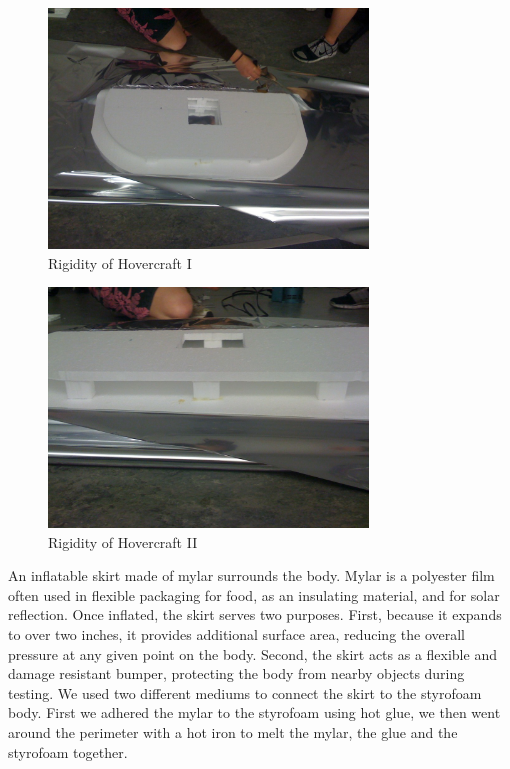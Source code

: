 \begin{figure}[h]
  \begin{center}
    \includegraphics[width=85mm]{imageSources/rigidity1.png}
  \end{center}
  \caption{Rigidity of Hovercraft I} 
  \label{rigidity1}
\end{figure}

\begin{figure}[h]
  \begin{center}
    \includegraphics[width=85mm]{imageSources/rigidity2.png}
  \end{center}
  \caption{Rigidity of Hovercraft II} 
  \label{rigidity2}
\end{figure}

An inflatable skirt made of mylar surrounds the body. Mylar is a polyester film often used in flexible packaging for food, as an insulating material, and for solar reflection. Once inflated, the skirt serves two purposes. First, because it expands to over two inches, it provides additional surface area, reducing the overall pressure at any given point on the body. Second, the skirt acts as a flexible and damage resistant bumper, protecting the body from nearby objects during testing. We used two different mediums to connect the skirt to the styrofoam body. First we adhered the mylar to the styrofoam using hot glue, we then went around the perimeter with a hot iron to melt the mylar, the glue and the styrofoam together.


